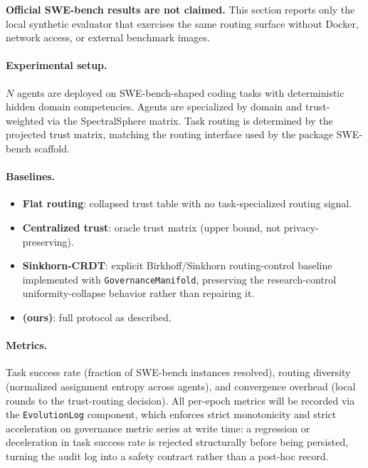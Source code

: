 \textbf{Official SWE-bench results are not claimed.}  This section reports only the
local synthetic evaluator that exercises the same routing surface without Docker,
network access, or external benchmark images.

\paragraph{Experimental setup.}
$N$ agents are deployed on SWE-bench-shaped coding tasks with deterministic hidden
domain competencies.  Agents are specialized by domain and trust-weighted via the
SpectralSphere matrix.  Task routing is determined by the projected trust matrix,
matching the routing interface used by the package SWE-bench scaffold.

\paragraph{Baselines.}
\begin{itemize}
  \item \textbf{Flat routing}: collapsed trust table with no task-specialized routing signal.
  \item \textbf{Centralized trust}: oracle trust matrix (upper bound, not privacy-preserving).
  \item \textbf{Sinkhorn-CRDT}: explicit Birkhoff/Sinkhorn routing-control baseline
    implemented with \texttt{GovernanceManifold}, preserving the research-control
    uniformity-collapse behavior rather than repairing it.
  \item \textbf{\fedsink{} (ours)}: full protocol as described.
\end{itemize}

\paragraph{Metrics.}
Task success rate (fraction of SWE-bench instances resolved), routing diversity
(normalized assignment entropy across agents), and convergence overhead (local rounds
to the trust-routing decision).
All per-epoch metrics will be recorded via the \texttt{EvolutionLog} component, which
enforces strict monotonicity and strict acceleration on governance metric series at
write time: a regression or deceleration in task success rate is rejected structurally
before being persisted, turning the audit log into a safety contract rather than a
post-hoc record.

